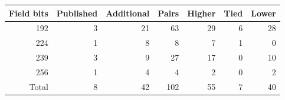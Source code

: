 \begin{tabular}{rrrrrrr}\toprule
Field bits & Published & Additional & Pairs & Higher & Tied & Lower\\\midrule
192 & 3 & 21 & 63 & 29 & 6 & 28\\
224 & 1 & 8 & 8 & 7 & 1 & 0\\
239 & 3 & 9 & 27 & 17 & 0 & 10\\
256 & 1 & 4 & 4 & 2 & 0 & 2\\
\midrule Total & 8 & 42 & 102 & 55 & 7 & 40\\\bottomrule\end{tabular}
